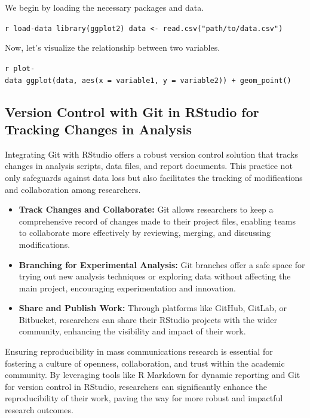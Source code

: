 \documentclass[
]{book}
\begin{document}
We begin by loading the necessary packages and data.

\texttt{r\ load-data\ library(ggplot2)\ data\ \textless{}-\ read.csv("path/to/data.csv")}

Now, let's visualize the relationship between two variables.

\texttt{r\ plot-data\ ggplot(data,\ aes(x\ =\ variable1,\ y\ =\ variable2))\ +\ geom\_point()}

\hypertarget{version-control-with-git-in-rstudio-for-tracking-changes-in-analysis}{%
\subsection*{Version Control with Git in RStudio for Tracking Changes in Analysis}\label{version-control-with-git-in-rstudio-for-tracking-changes-in-analysis}}

Integrating Git with RStudio offers a robust version control solution that tracks changes in analysis scripts, data files, and report documents. This practice not only safeguards against data loss but also facilitates the tracking of modifications and collaboration among researchers.

\begin{itemize}
\item
  \textbf{Track Changes and Collaborate:} Git allows researchers to keep a comprehensive record of changes made to their project files, enabling teams to collaborate more effectively by reviewing, merging, and discussing modifications.
\item
  \textbf{Branching for Experimental Analysis:} Git branches offer a safe space for trying out new analysis techniques or exploring data without affecting the main project, encouraging experimentation and innovation.
\item
  \textbf{Share and Publish Work:} Through platforms like GitHub, GitLab, or Bitbucket, researchers can share their RStudio projects with the wider community, enhancing the visibility and impact of their work.
\end{itemize}

Ensuring reproducibility in mass communications research is essential for fostering a culture of openness, collaboration, and trust within the academic community. By leveraging tools like R Markdown for dynamic reporting and Git for version control in RStudio, researchers can significantly enhance the reproducibility of their work, paving the way for more robust and impactful research outcomes.
\end{document}
